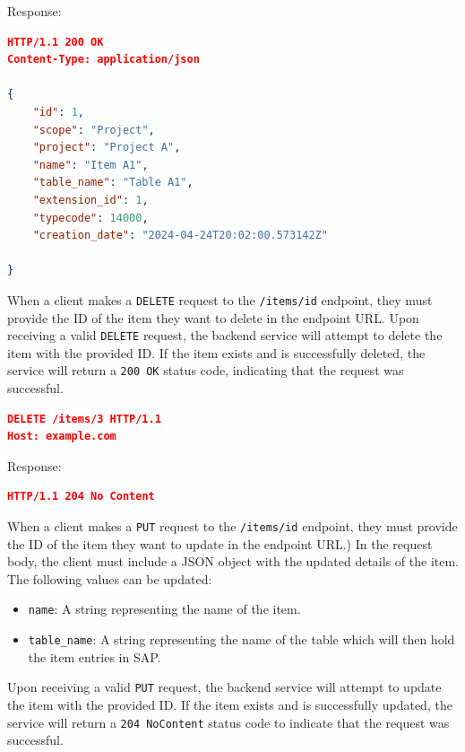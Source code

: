 Response:

\begin{lstlisting}[language=json,label={lst:lstlisting10}]
HTTP/1.1 200 OK
Content-Type: application/json

{
    "id": 1,
    "scope": "Project",
    "project": "Project A",
    "name": "Item A1",
    "table_name": "Table A1",
    "extension_id": 1,
    "typecode": 14000,
    "creation_date": "2024-04-24T20:02:00.573142Z"

}
\end{lstlisting}


When a client makes a \texttt{DELETE} request to the \texttt{/items/{id}} endpoint, they must provide the ID of the item they want to delete in the endpoint URL.
Upon receiving a valid \texttt{DELETE} request, the backend service will attempt to delete the item with the provided ID.
If the item exists and is successfully deleted, the service will return a \texttt{200 OK} status code, indicating that the request was successful.

\begin{lstlisting}[language=json,label={lst:lstlisting7}]
DELETE /items/3 HTTP/1.1
Host: example.com
\end{lstlisting}

Response:

\begin{lstlisting}[language=json,label={lst:lstlisting8}]
HTTP/1.1 204 No Content
\end{lstlisting}


When a client makes a \texttt{PUT} request to the \texttt{/items/{id}} endpoint, they must provide the ID of the item they want to update in the endpoint URL.)
In the request body, the client must include a JSON object with the updated details of the item.
The following values can be updated:
\begin{itemize}
    \item \texttt{name}: A string representing the name of the item.
    \item \texttt{table\_name}: A string representing the name of the table which will then hold the item entries in SAP.
\end{itemize}

Upon receiving a valid \texttt{PUT} request, the backend service will attempt to update the item with the provided ID.
If the item exists and is successfully updated, the service will return a \texttt{204 NoContent} status code to indicate that the request was successful.

